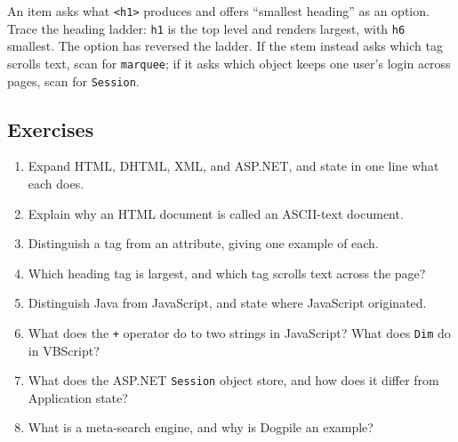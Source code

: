 \begin{example}
An item asks what \texttt{<h1>} produces and offers ``smallest heading'' as an option. Trace the heading ladder: \texttt{h1} is the top level and renders largest, with \texttt{h6} smallest. The option has reversed the ladder. If the stem instead asks which tag scrolls text, scan for \texttt{marquee}; if it asks which object keeps one user's login across pages, scan for \texttt{Session}.
\end{example}

\subsection*{Exercises}
\begin{enumerate}[label=\arabic*.]
  \item Expand HTML, DHTML, XML, and ASP.NET, and state in one line what each does.
  \item Explain why an HTML document is called an ASCII-text document.
  \item Distinguish a tag from an attribute, giving one example of each.
  \item Which heading tag is largest, and which tag scrolls text across the page?
  \item Distinguish Java from JavaScript, and state where JavaScript originated.
  \item What does the \texttt{+} operator do to two strings in JavaScript? What does \texttt{Dim} do in VBScript?
  \item What does the ASP.NET \texttt{Session} object store, and how does it differ from Application state?
  \item What is a meta-search engine, and why is Dogpile an example?
\end{enumerate}


